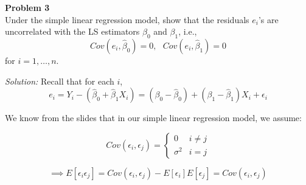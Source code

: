 \documentclass{article}
\newenvironment{problem}[2][Problem]
    { \begin{mdframed}[backgroundcolor=gray!20] \textbf{#1 #2} \\}
    {  \end{mdframed}}
\newenvironment{solution}
    {\textit{Solution:}}
    {}
\begin{document}
\begin{problem}{3}
Under the simple linear regression model, show that the residuals $e_i$'s are uncorrelated
with the LS estimators $\beta_0$ and $\beta_1$, i.e.,
$$Cov(e_i, \hat \beta_0) = 0, \ \ \ Cov(e_i, \hat \beta_1) = 0$$
for $i = 1,\ldots , n$.
\end{problem}
\begin{solution}
Recall that for each $i$, 
$$e_i = Y_i - ( \hat \beta_0 + \hat \beta_1 X_i) = (\beta_0 - \hat \beta_0) + (\beta_1 - \hat \beta_1) X_i + \epsilon_i$$

We know from the slides that in our simple linear regression model, we assume: 

$$Cov(\epsilon_i, \epsilon_j) = \begin{cases}
0 & i \not = j \\
\sigma^2 & i = j
\end{cases}$$

$$\implies E[\epsilon_i \epsilon_j] = Cov(\epsilon_i, \epsilon_j) - E[\epsilon_i]E[\epsilon_j] = Cov(\epsilon_i, \epsilon_j)  $$


\end{solution}
\end{document}
